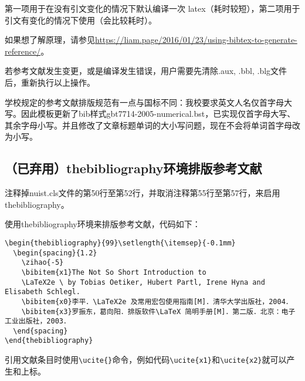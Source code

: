 第一项用于在没有引文变化的情况下默认编译一次 latex（耗时较短），第二项用于引文有变化的情况下使用（会比较耗时）。

如果想了解原理，请参见\url{https://liam.page/2016/01/23/using-bibtex-to-generate-reference/}。

若参考文献发生变更，或是编译发生错误，用户需要先清除.aux, .bbl, .blg文件后，重新执行以上操作。

学校规定的参考文献排版规范有一点与国标\cite{陈浩元2015GB}不同：我校要求英文人名仅首字母大写。因此模板更新了bib样式gbt7714-2005-numerical.bst，已实现仅首字母大写、其余字母小写。并且修改了文章标题单词的大小写问题，现在不会将单词首字母改为小写。

\subsection{（已弃用）thebibliography环境排版参考文献}

注释掉nuist.cls文件的第50行至第52行，并取消注释第55行至第57行，来启用thebibliography。

使用thebibliography环境来排版参考文献，代码如下：

{
\color{green!50!black}
\begin{lstlisting}[breaklines=true,]
\begin{thebibliography}{99}\setlength{\itemsep}{-0.1mm}
  \begin{spacing}{1.2}
    \zihao{-5}
    \bibitem{x1}The Not So Short Introduction to 
    \LaTeX2e \ by Tobias Oetiker, Hubert Partl, Irene Hyna and Elisabeth Schlegl.
    \bibitem{x0}李平．\LaTeX2e 及常用宏包使用指南[M]．清华大学出版社，2004．
    \bibitem{x3}罗振东，葛向阳．排版软件\LaTeX 简明手册[M]．第二版．北京：电子工业出版社，2003．
  \end{spacing}
\end{thebibliography}
\end{lstlisting}
}

引用文献条目时使用\verb|\ucite{}|命令，例如代码\verb|\ucite{x1}|和\verb|\ucite{x2}|就可以产生\cite{x1}和\cite{x2}上标。
